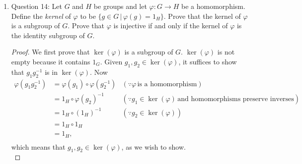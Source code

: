 \documentclass{article}
\begin{document}
\begin{enumerate}
\begin{enumerate}
\begin{proof}
          \begin{align*}
            \varphi(g_1g_2^{-1})      & = \varphi(g_1)\circ\varphi(g_2^{-1})  & (\because\varphi\,\text{is a homomorphism}) \\
              & = \varphi(g_1)\circ\varphi(g_2)^{-1} & (\because\text{homomorphisms preserve inverses}) \\
              & = h_1\circ h_2^{-1},  & (\because h_1=\varphi(g_1)\,\text{and}\,h_2=\varphi(g_2)) \\
          \end{align*}
          which implies $h_1\circ h_2^{-1}\in \varphi(G)$, as we wish to
          show. \\

          Assume that $\varphi$ is injective.
          $\varphi\upharpoonright\varphi(G)$ is clearly surjective, so
          $\varphi$ is a bijective homomorphism. It suffices to show that
          all bijective homomorphisms are isomorphisms, for which we just
          need to show that the inverse map $\varphi^{-1}$ is a
          homomorphism. Let $h_1,h_2\in\varphi(G)$. Then there exists
          $g_1,g_2\in G$ such that $h_1=\varphi(g_1)$ and
          $h_2=\varphi(g_2)$. By homomorphism of $\varphi$,
          $\varphi(g_1g_2)=h_1\circ h_2$. Then by bijectiveness of
          $\varphi$, $\varphi^{-1}(h_1\circ
          h_2)=g_1g_2=\varphi(h_1)\varphi(h_2)$, which proves the
          homomorphism of $\varphi^{-1}$. 
        \end{proof}

      \item Question 14: Let $G$ and $H$ be groups and let
        $\varphi:G\rightarrow H$ be a homomorphism. Define the
        \textit{kernel} of $\varphi$ to be $\{g\in G\,|\,\varphi(g)=1_H\}$.
        Prove that the kernel of $\varphi$ is a subgroup of $G$. Prove that
        $\varphi$ is injective if and only if the kernel of $\varphi$ is
        the identity subgroup of $G$.

        \begin{proof}
          We first prove that $\ker(\varphi)$ is a subgroup of $G$.
          $\ker(\varphi)$ is not empty because it contains $1_G$. Given
          $g_1,g_2\in\ker(\varphi)$, it suffices to show that $g_1g_2^{-1}$
          is in $\ker(\varphi)$. Now
          \begin{align*}
            \varphi(g_1g_2^{-1})  & = \varphi(g_1)\circ\varphi(g_2^{-1})  &
            (\because\varphi\,\text{is a homomorphism}) \\
              & = 1_H\circ\varphi(g_2)^{-1} & (\because
              g_1\in\ker(\varphi)\,\text{and homomorphisms preserve inverses}) \\
              & = 1_H\circ(1_H)^{-1}        & (\because g_2\in\ker(\varphi)) \\
              & = 1_H\circ1_H \\
              & = 1_H, \\
          \end{align*}
          which means that $g_1,g_2\in\ker(\varphi)$, as we wish to show.
          \\


\end{proof}
\end{enumerate}
\end{enumerate}
\end{document}
